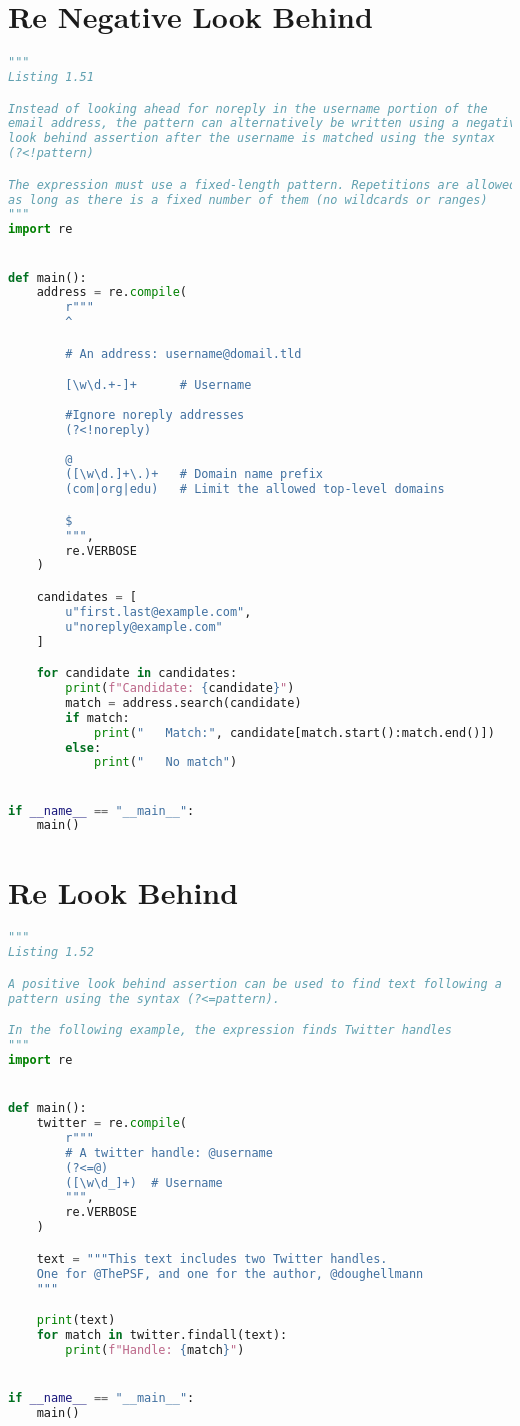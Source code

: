\documentclass[a4paper,landscape]{report}
\begin{document}
\section{Re Negative Look Behind}
\begin{lstlisting}[language=Python]
"""
Listing 1.51

Instead of looking ahead for noreply in the username portion of the
email address, the pattern can alternatively be written using a negative
look behind assertion after the username is matched using the syntax
(?<!pattern)

The expression must use a fixed-length pattern. Repetitions are allowed,
as long as there is a fixed number of them (no wildcards or ranges)
"""
import re


def main():
    address = re.compile(
        r"""
        ^

        # An address: username@domail.tld

        [\w\d.+-]+      # Username
        
        #Ignore noreply addresses
        (?<!noreply)
        
        @
        ([\w\d.]+\.)+   # Domain name prefix
        (com|org|edu)   # Limit the allowed top-level domains

        $
        """,
        re.VERBOSE
    )

    candidates = [
        u"first.last@example.com",
        u"noreply@example.com"
    ]

    for candidate in candidates:
        print(f"Candidate: {candidate}")
        match = address.search(candidate)
        if match:
            print("   Match:", candidate[match.start():match.end()])
        else:
            print("   No match")


if __name__ == "__main__":
    main()

\end{lstlisting}
\section{Re Look Behind}
\begin{lstlisting}[language=Python]
"""
Listing 1.52

A positive look behind assertion can be used to find text following a
pattern using the syntax (?<=pattern).

In the following example, the expression finds Twitter handles
"""
import re


def main():
    twitter = re.compile(
        r"""
        # A twitter handle: @username
        (?<=@)
        ([\w\d_]+)  # Username
        """,
        re.VERBOSE
    )

    text = """This text includes two Twitter handles.
    One for @ThePSF, and one for the author, @doughellmann
    """

    print(text)
    for match in twitter.findall(text):
        print(f"Handle: {match}")


if __name__ == "__main__":
    main()

\end{lstlisting}
\end{document}

